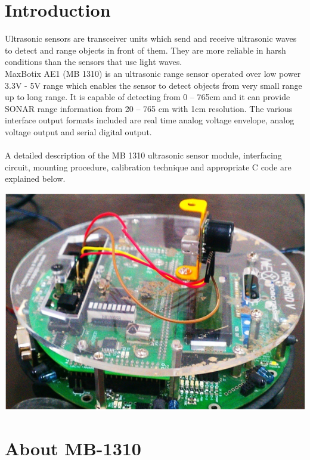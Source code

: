 \documentclass[a4paper,29.6pt]{article}
\begin{document}
\section{Introduction}

\begin{large}
\hspace{.5in}Ultrasonic sensors are transceiver units which send and receive ultrasonic waves to detect and range objects in front of them. They are more reliable in harsh conditions than the sensors that use light waves. \\

MaxBotix AE1 (MB 1310) is an ultrasonic range sensor operated over low power 3.3V - 5V range which enables the sensor to detect objects from very small range up to long range. It is capable of detecting from 0 – 765cm and it can provide SONAR range information from 20 – 765 cm with 1cm resolution. The various interface output formats included are real time analog voltage envelope, analog voltage output and serial digital output.  
\\\\
A detailed description of the MB 1310 ultrasonic sensor module, interfacing circuit, mounting procedure, calibration technique and appropriate C code are explained below.\\

\end{large}
\begin{center}
\includegraphics[scale=0.5]{1}
\end{center}


\newpage
\section{About MB-1310}
\end{document}
